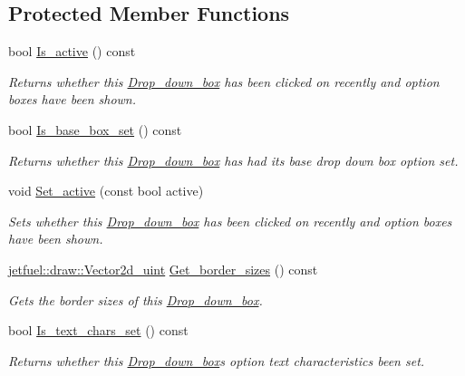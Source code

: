 \subsection*{Protected Member Functions}
\begin{DoxyCompactItemize}
\item 
bool \hyperlink{classjetfuel_1_1gui_1_1Drop__down__box_ab64b631bab270d3dac14affb4b777fd4}{Is\+\_\+active} () const
\begin{DoxyCompactList}\small\item\em Returns whether this \hyperlink{classjetfuel_1_1gui_1_1Drop__down__box}{Drop\+\_\+down\+\_\+box} has been clicked on recently and option boxes have been shown. \end{DoxyCompactList}\item 
bool \hyperlink{classjetfuel_1_1gui_1_1Drop__down__box_aae9fb50bc6ad4ac4b8cf5570570d6f95}{Is\+\_\+base\+\_\+box\+\_\+set} () const
\begin{DoxyCompactList}\small\item\em Returns whether this \hyperlink{classjetfuel_1_1gui_1_1Drop__down__box}{Drop\+\_\+down\+\_\+box} has had it\textquotesingle{}s base drop down box option set. \end{DoxyCompactList}\item 
void \hyperlink{classjetfuel_1_1gui_1_1Drop__down__box_a0a52de8d01db19c0600f3060ad3c444d}{Set\+\_\+active} (const bool active)
\begin{DoxyCompactList}\small\item\em Sets whether this \hyperlink{classjetfuel_1_1gui_1_1Drop__down__box}{Drop\+\_\+down\+\_\+box} has been clicked on recently and option boxes have been shown. \end{DoxyCompactList}\item 
\hyperlink{classjetfuel_1_1draw_1_1Vector2d}{jetfuel\+::draw\+::\+Vector2d\+\_\+uint} \hyperlink{classjetfuel_1_1gui_1_1Drop__down__box_a2164954ae3befe20f57d4fde86e13f15}{Get\+\_\+border\+\_\+sizes} () const
\begin{DoxyCompactList}\small\item\em Gets the border sizes of this \hyperlink{classjetfuel_1_1gui_1_1Drop__down__box}{Drop\+\_\+down\+\_\+box}. \end{DoxyCompactList}\item 
bool \hyperlink{classjetfuel_1_1gui_1_1Drop__down__box_a50162434604bbee6278a00067c1f114b}{Is\+\_\+text\+\_\+chars\+\_\+set} () const
\begin{DoxyCompactList}\small\item\em Returns whether this \hyperlink{classjetfuel_1_1gui_1_1Drop__down__box}{Drop\+\_\+down\+\_\+box}\textquotesingle{}s option text characteristics been set. \end{DoxyCompactList}\item 

\end{DoxyCompactItemize}
